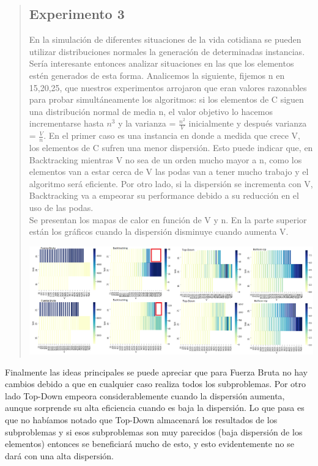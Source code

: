 \documentclass[7pt,a4paper]{article}
\begin{document}
\begin{verse}
\subsection{Experimento 3}
En la simulación de diferentes situaciones de la vida cotidiana se pueden utilizar distribuciones normales la generación de determinadas instancias. Sería interesante entonces analizar situaciones en las que los elementos estén generados de esta forma.
Analicemos la siguiente, fijemos n en 15,20,25, que nuestros experimentos arrojaron que eran valores razonables para probar simultáneamente los algoritmos: si los elementos de C siguen una distribución normal de media n, el valor objetivo lo hacemos incrementarse hasta $n^{3}$ y la varianza = $\frac{n^{2}}{V}$ inicialmente y después varianza = $\frac{V}{n}$. En el primer caso es una instancia en donde a medida que crece V, los elementos de C sufren una menor dispersión. Esto puede indicar que, en Backtracking mientras V no sea de un orden mucho mayor a n, como los elementos van a estar cerca de V las podas van a tener mucho trabajo y el algoritmo será eficiente. Por otro lado, si la dispersión se incrementa con V, Backtracking va a empeorar su performance debido a su reducción en el uso de las podas.\\
Se presentan los mapas de calor en función de V y n. En la parte superior están los gráficos cuando la dispersión disminuye cuando aumenta V.
\begin{center}
\includegraphics[scale=.4]{comp_distr_normal.png}
\end{center}
\end{verse}
Finalmente las ideas principales se puede apreciar que para Fuerza Bruta no hay cambios debido a que en cualquier caso realiza todos los subproblemas. Por otro lado Top-Down empeora considerablemente cuando la dispersión aumenta, aunque sorprende su alta eficiencia cuando es baja la dispersión. Lo que pasa es que no habíamos notado que Top-Down almacenará los resultados de los subproblemas y si esos subproblemas son muy parecidos (baja dispersión de los elementos) entonces se beneficiará mucho de esto, y esto evidentemente no se dará con una alta dispersión. \\
\end{document}
